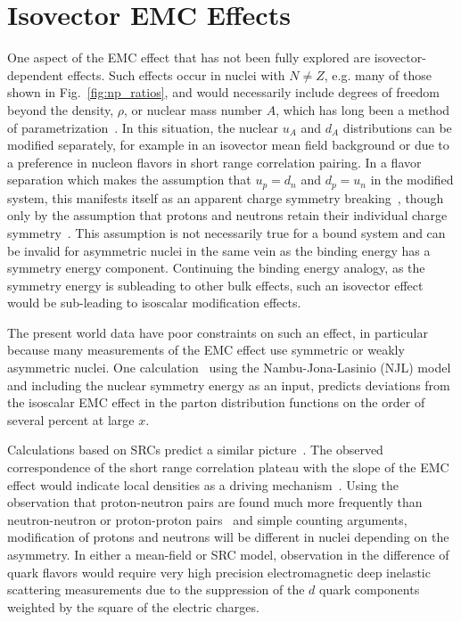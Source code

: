\section{Isovector EMC Effects\label{sec:ivemc}}
%
One aspect of the EMC effect that has not been fully explored are isovector-dependent effects.  Such effects occur in nuclei with $N \neq Z$, e.g. many of those shown in Fig.~\ref{fig:np_ratios}, and would necessarily include degrees of freedom beyond the density, $\rho$, or nuclear mass number $A$, which has long been a method of parametrization~\cite{Malace:2014uea}.  In this situation, the nuclear $u_A$ and $d_A$ distributions can be modified separately, for example in an isovector mean field background or due to a preference in nucleon flavors in short range correlation pairing.  In a flavor separation which makes the assumption that $u_p = d_n$ and $d_p = u_n$ in the modified system, this manifests itself as an apparent charge symmetry breaking~\cite{Londergan:2009kj}, though only by the assumption that protons and neutrons retain their individual charge symmetry~\cite{Londergan:2009kj}. This assumption is not necessarily true for a bound system and can be invalid for asymmetric nuclei in the same vein as the binding energy has a symmetry energy component.  Continuing the binding energy analogy, as the symmetry energy is subleading to other bulk effects, such an isovector effect would be sub-leading to isoscalar modification effects.

The present world data have poor constraints on such an effect, in particular because many measurements of the EMC effect use symmetric or weakly asymmetric nuclei. One calculation~\cite{Cloet:2009qs,Cloet:2012td} using the Nambu-Jona-Lasinio (NJL) model and including the nuclear symmetry energy as an input, predicts deviations from the isoscalar EMC effect in the parton distribution functions on the order of several percent at large $x$.

Calculations based on SRCs predict a similar picture~\cite{Sargsian:2012sm, Arrington:2015wja}.  The observed correspondence of the short range correlation plateau with the slope of the EMC effect would indicate local densities as a driving mechanism~\cite{Weinstein:2010rt}.  Using the observation that proton-neutron pairs are found much more frequently than neutron-neutron or proton-proton pairs~\cite{Subedi:2008zz} and simple counting arguments, modification of protons and neutrons will be different in nuclei depending on the asymmetry.  In either a mean-field or SRC model, observation in the difference of quark flavors would require very high precision electromagnetic deep inelastic scattering measurements due to the suppression of the $d$ quark components weighted by the square of the electric charges. 


